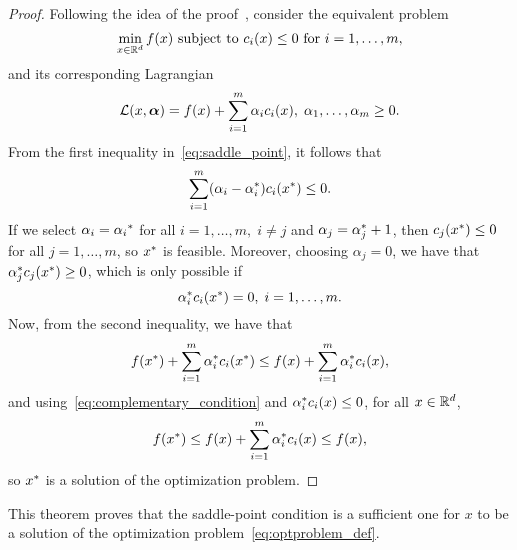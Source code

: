 \begin{proof}
Following the idea of the proof~\citep{ScholkopfS02}, consider the equivalent problem
    \begin{equation}
        \nonumber
        \min_{x \in \mathbb{R}^d} f(x) \text{ subject to } c_i(x) \leq 0 \text{ for } i=1, \ldots, m ,
    \end{equation}
and its corresponding Lagrangian
\begin{equation}
    \nonumber
    \mathcal{L}(x, \bm{\alpha}) = f(x) + \sum_{i=1}^m \alpha_i c_i(x) , \; \alpha_1, \ldots, \alpha_m \geq 0 .
\end{equation}
From the first inequality in~\eqref{eq:saddle_point}, it follows that 
$$ \sum_{i=1}^m (\alpha_i- {\alpha}^*_i) c_i({x}^*) \leq 0 .$$
If we select $\alpha_i = {\alpha_i}^*$ for all $i=1, \ldots, m,\; i \neq j$ and $\alpha_{j} = {\alpha}^*_{j} + 1$, then
$c_j({x}^*) \leq 0$ for all $j=1, \ldots, m$, so ${x}^*$ is feasible.
%
Moreover, choosing $\alpha_{j} = 0$, we have that ${\alpha}^*_j c_j({x}^*) \geq 0$, which is only possible if 
\begin{equation}\label{eq:complementary_condition}
    \opt{\alpha}_i c_i(\opt{x}) = 0 , \; i=1, \ldots, m .
\end{equation}
Now, from the second inequality, we have that
\begin{equation}
    \nonumber
    f({x}^*) + \sum_{i=1}^m {\alpha}^*_i c_i({x}^*) \leq f(x) + \sum_{i=1}^m {\alpha}^*_i c_i(x) ,
\end{equation}
and using~\eqref{eq:complementary_condition} and ${\alpha}^*_i c_i(x) \leq 0$, for all $x \in \mathbb{R}^d$,
\begin{equation}
    \nonumber
    f({x}^*) \leq f(x) + \sum_{i=1}^m {\alpha}^*_i c_i(x) \leq f(x) ,
\end{equation}
so ${x}^*$ is a solution of the optimization problem.
\end{proof}
%
This theorem proves that the saddle-point condition is a sufficient one for $x$ to be a solution of the optimization problem~\eqref{eq:optproblem_def}.
